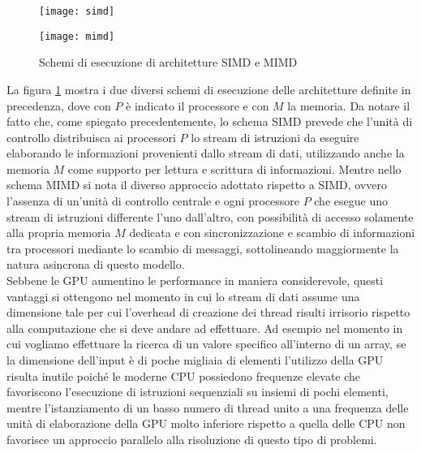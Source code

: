 \begin{figure}[t]
    \begin{minipage}[b]{.5\linewidth}
        \centering
        \texttt{[image: simd]}
    \end{minipage}
    \begin{minipage}[b]{.5\linewidth}
        \centering
        \texttt{[image: mimd]}
    \end{minipage}
    \caption{Schemi di esecuzione di architetture SIMD e MIMD}
    \label{fig:simd-mimd}
\end{figure}

La figura \ref{fig:simd-mimd} mostra i due diversi schemi di esecuzione
delle architetture definite in precedenza, dove con $P$ è indicato il processore
e con $M$ la memoria. Da notare il fatto che, come spiegato precedentemente,
lo schema SIMD prevede che l'unità di controllo distribuisca ai processori $P$
lo stream di istruzioni da eseguire elaborando le informazioni
provenienti dallo stream di dati, utilizzando anche la memoria $M$ come supporto
per lettura e scrittura di informazioni. Mentre nello schema MIMD si nota
il diverso approccio adottato rispetto a SIMD, ovvero l'assenza di un'unità
di controllo centrale e ogni processore $P$ che esegue
uno stream di istruzioni differente l'uno dall'altro,
con possibilità di accesso solamente alla
propria memoria $M$ dedicata e con sincronizzazione e scambio di informazioni
tra processori mediante lo scambio di messaggi, sottolineando maggiormente
la natura asincrona di questo modello.
\\
Sebbene le GPU aumentino le performance in maniera considerevole, questi
vantaggi si ottengono nel momento in cui lo stream di dati assume
una dimensione tale per cui l'overhead di creazione dei thread risulti
irrisorio rispetto alla computazione che si deve andare ad effettuare.
Ad esempio nel momento in cui vogliamo effettuare la ricerca di un valore
specifico all'interno di un array, se la dimensione dell'input è di poche
migliaia di elementi l'utilizzo della GPU risulta inutile poiché
le moderne CPU possiedono frequenze elevate che favoriscono l'esecuzione
di istruzioni sequenziali su insiemi di pochi elementi, mentre l'istanziamento
di un basso numero di thread unito a una frequenza delle unità di elaborazione
della GPU molto inferiore rispetto a quella delle CPU non favorisce un
approccio parallelo alla risoluzione di questo tipo di problemi.
